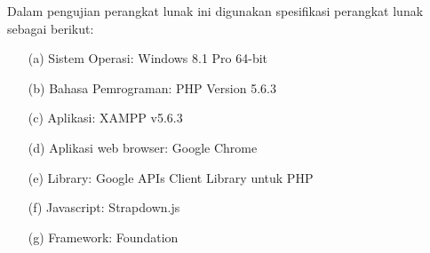 Dalam pengujian perangkat lunak ini digunakan spesifikasi perangkat lunak
sebagai berikut:

\begin{enumerate}
\item[(a)] Sistem Operasi: Windows 8.1 Pro 64-bit
\item[(b)] Bahasa Pemrograman: PHP Version 5.6.3
\item[(c)] Aplikasi: XAMPP v5.6.3
\item[(d)] Aplikasi web browser: Google Chrome
\item[(e)] Library: Google APIs Client Library untuk PHP
\item[(f)] Javascript: Strapdown.js
\item[(g)] Framework: Foundation
\end{enumerate}

